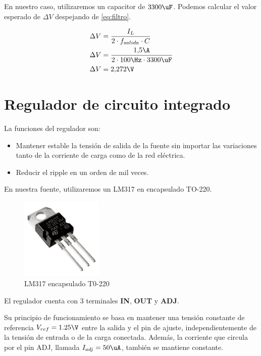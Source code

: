 En nuestro caso, utilizaremos un capacitor de $3300\uF$. Podemos calcular el valor esperado de $\Delta V$ despejando de \ref{eq:filtro}.

\begin{equation}
  \begin{aligned}
    \Delta V&=\frac{I_L}{2 \cdot f_{salida} \cdot C}\\
    \Delta V&=\frac{1{,}5\A}{2 \cdot 100\Hz \cdot 3300\uF}\\
    \Delta V&= 2{,}272 \V
  \end{aligned}
\end{equation}

\section{Regulador de circuito integrado}
La funciones del regulador son:

\begin{itemize}
  \item Mantener estable la tensión de salida de la fuente sin importar las variaciones tanto de la corriente de carga como de la red eléctrica.
  \item Reducir el ripple en un orden de mil veces.
\end{itemize}

En nuestra fuente, utilizaremos un LM317 en encapsulado TO-220.

\begin{figure}[h]
  \centering
  \includegraphics[width=0.35\textwidth]{images/LM317-TO220.png}
  \caption{LM317 encapsulado T0-220}
\end{figure}

El regulador cuenta con 3 terminales \textbf{IN}, \textbf{OUT} y \textbf{ADJ}.

Su principio de funcionamiento se basa en mantener una tensión constante de referencia $V_{ref} = 1.25\V$ entre la salida y el pin de ajuste, independientemente
de la tensión de entrada o de la carga conectada. Además, la corriente que circula por el pin ADJ, llamada $I_{adj} = 50 \uA$, también se mantiene constante.

